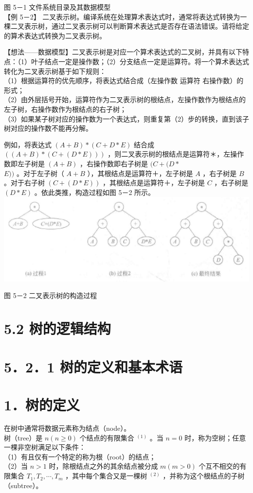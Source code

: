 \documentclass[10pt]{article}
\begin{document}
图 5－1 文件系统目录及其数据模型\\
【例 5－2】 二叉表示树。编译系统在处理算术表达式时，通常将表达式转换为一棵二叉表示树，通过二叉表示树可以判断算术表达式是否存在语法错误。请将给定的算术表达式转换为二叉表示树。

【想法——数据模型】二叉表示树是对应一个算术表达式的二叉树，并具有以下特点：（1）叶子结点一定是操作数；（2）分支结点一定是运算符。将一个算术表达式转化为二叉表示树基于如下规则：\\
（1）根据运算符的优先顺序，将表达式结合成（左操作数 运算符 右操作数）的形式；\\
（2）由外层括号开始，运算符作为二叉表示树的根结点，左操作数作为根结点的左子树，右操作数作为根结点的右子树；\\
（3）如果某子树对应的操作数为一个表达式，则重复第（2）步的转换，直到该子树对应的操作数不能再分解。

例如，将表达式 $(A+B) *(C+D * E)$ 结合成 $((A+B) *(C+(D * E)))$ ，则二叉表示树的根结点是运算符＊，左操作数即左子树是 $(A+B)$ ，右操作数即右子树是 $(C+(D *$\\
$E))$ 。对于左子树（ $A+B$ ），其根结点是运算符＋，左子树是 $A$ ，右子树是 $B$ 。对于右子树 $(C+(D * E))$ ，其根结点是运算符＋，左子树是 $C$ ，右子树是 $(D * E)$ 。依此类推，构造过程如图 5－2 所示。\\
\includegraphics[max width=\textwidth, center]{2025_06_06_704745ea57b15b2333e5g-142}

图 5－2 二叉表示树的构造过程

\section*{5.2 树的逻辑结构}
\section*{5．2．1 树的定义和基本术语}
\section*{1．树的定义}
在树中通常将数据元素称为结点（node）。\\
树（tree）是 $n(n \geqslant 0)$ 个结点的有限集合 ${ }^{(1)}$ 。当 $n=0$ 时，称为空树；任意一棵非空树满足以下条件：\\
（1）有且仅有一个特定的称为根（root）的结点；\\
（2）当 $n>1$ 时，除根结点之外的其余结点被分成 $m(m>0)$ 个互不相交的有限集合 $T_{1}, T_{2}, \cdots, T_{m}$ ，其中每个集合又是一棵树 ${ }^{(2)}$ ，并称为这个根结点的子树（subtree）。
\end{document}
